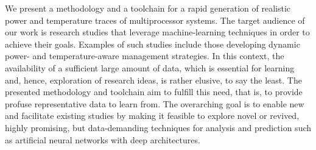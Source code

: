 We present a methodology and a toolchain for a rapid generation of realistic
power and temperature traces of multiprocessor systems. The target audience of
our work is research studies that leverage machine-learning techniques in order
to achieve their goals. Examples of such studies include those developing
dynamic power- and temperature-aware management strategies. In this context, the
availability of a sufficient large amount of data, which is essential for
learning and, hence, exploration of research ideas, is rather elusive, to say
the least. The presented methodology and toolchain aim to fulfill this need,
that is, to provide profuse representative data to learn from. The overarching
goal is to enable new and facilitate existing studies by making it feasible to
explore novel or revived, highly promising, but data-demanding techniques for
analysis and prediction such as artificial neural networks with deep
architectures.
